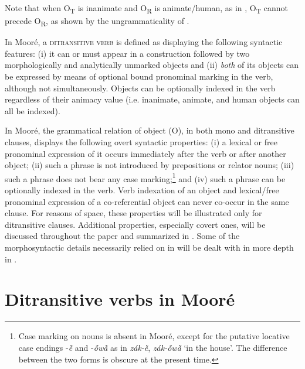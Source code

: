 \documentclass[output=paper]{langsci/langscibook}
\begin{document}
Note that when O\textsubscript{T} is inanimate and O\textsubscript{R} is animate/human, as in , O\textsubscript{T} cannot precede O\textsubscript{R}, as shown by the ungrammaticality of .

\z

In Mooré, a \textsc{ditransitive verb} is defined as displaying the following syntactic features: (i) it can or must appear in a construction followed by two morphologically and analytically unmarked objects and (ii) \textit{both} of its objects can be expressed by means of optional bound pronominal marking in the verb, although not simultaneously. Objects can be optionally indexed in the verb regardless of their animacy value (i.e. inanimate, animate, and human objects can all be indexed).

In Mooré, the grammatical relation of object (O), in both mono and ditransitive clauses, displays the following overt syntactic properties: (i) a lexical or free pronominal expression of it occurs immediately after the verb or after another object; (ii) such a phrase is not introduced by prepositions or relator nouns; (iii) such a phrase does not bear any case marking;\footnote{Case marking on nouns is absent in Mooré, except for the putative locative case endings -\textit{\`{ẽ}} and -\textit{\'{õ}w\`{ã}} as in \textit{zák-\`{ẽ}}, \textit{zák-\'{õ}w\`{ã}} `in the house'. The difference between the two forms is obscure at the present time.} and (iv) such a phrase can be optionally indexed in the verb. Verb indexation of an object and lexical/free pronominal expression of a co-referential object can never co-occur in the same clause. For reasons of space, these properties will be illustrated only for ditransitive clauses. Additional properties, especially covert ones, will be discussed throughout the paper and summarized in . Some of the morphosyntactic details necessarily relied on in   will be dealt with in more depth in .

\section{Ditransitive verbs in Mooré}\label{§3:ditransitive.pacchiarotti}
\end{document}
